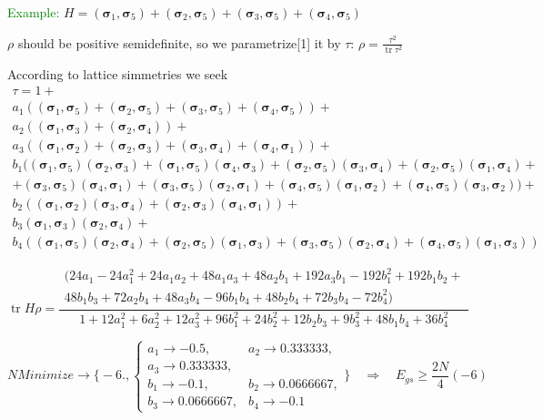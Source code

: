 \documentclass[portratit,a1paper,fontscale=0.58]{baposter} %
\newcommand{\tr}{\mathop{tr}}
\newcommand{\cc}{{\boldsymbol{\sigma}}}
\begin{document}
\begin{poster}
{\vspace{0.5em}

\textcolor{green}{Example:} $H=(\cc_1,\cc_5)+(\cc_2,\cc_5)+(\cc_3,\cc_5)+(\cc_4,\cc_5)$


$\rho$ should be positive semidefinite, so we parametrize[1] it by $\tau$: $\rho=\frac{\tau^2}{\tr\tau^2}$

According to lattice simmetries we seek
$$\begin{gathered}
\tau=1 + \\
a_1 ((\cc_1, \cc_5) + (\cc_2, \cc_5) + (\cc_3, \cc_5) + (\cc_4, \cc_5)) + \\
a_2 ((\cc_1, \cc_3) + (\cc_2, \cc_4)) + \\
a_3 ((\cc_1, \cc_2) + (\cc_2, \cc_3) + (\cc_3, \cc_4) + (\cc_4, \cc_1)) + \\
b_1 ((\cc_1, \cc_5) (\cc_2, \cc_3) + (\cc_1, \cc_5) (\cc_4, \cc_3) + (\cc_2, \cc_5) (\cc_3, \cc_4) + (\cc_2, \cc_5) (\cc_1, \cc_4) + \\
+ (\cc_3, \cc_5) (\cc_4, \cc_1) + (\cc_3, \cc_5) (\cc_2, \cc_1) + (\cc_4, \cc_5) (\cc_1, \cc_2) + (\cc_4, \cc_5) (\cc_3, \cc_2)) + \\
b_2 ((\cc_1, \cc_2) (\cc_3, \cc_4) + (\cc_2, \cc_3) (\cc_4, \cc_1)) + \\
b_3 (\cc_1, \cc_3) (\cc_2, \cc_4) + \\
b_4 ((\cc_1, \cc_5) (\cc_2, \cc_4) + (\cc_2, \cc_5) (\cc_1, \cc_3) + (\cc_3, \cc_5) (\cc_2, \cc_4) + (\cc_4, \cc_5) (\cc_1, \cc_3))
\end{gathered}$$

$$\tr H\rho = \frac{\begin{gathered}(
24 a_1 - 24 a_1^2 + 24 a_1 a_2 + 48 a_1 a_3 + 48 a_2 b_1 + 192 a_3 b_1 - 192 b_1^2 + 192 b_1 b_2 + \\
48 b_1 b_3 + 72 a_2 b_4 + 48 a_3 b_4 - 96 b_1 b_4 + 48 b_2 b_4 + 72 b_3 b_4 - 72 b_4^2)\end{gathered}}
{1 + 12 a_1^2 + 6 a_2^2 + 12 a_3^2 + 96 b_1^2 + 24 b_2^2 + 12 b_2 b_3 + 9 b_3^2 + 48 b_1 b_4 + 36 b_4^2}$$

$$NMinimize\rightarrow\Bigg\{-6., \begin{cases}
a_1 \rightarrow -0.5,&a_2 \rightarrow 0.333333, \\a_3 \rightarrow 0.333333, \\
b_1 \rightarrow -0.1,&b_2 \rightarrow 0.0666667,\\
b_3 \rightarrow 0.0666667, &b_4 \rightarrow -0.1
\end{cases}\Bigg\} \quad\Rightarrow\quad
E_{gs}\geqslant\frac{2N}{4}(-6)
$$

}
\end{poster}
\end{document}
